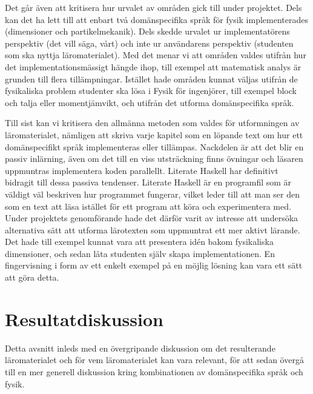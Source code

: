 Det går även att kritisera hur urvalet av områden gick till under projektet. Dels kan det ha lett till att enbart två domänspecifika språk för fysik implementerades (dimensioner och partikelmekanik). Dels skedde urvalet ur implementatörens perspektiv (det vill säga, vårt) och inte ur användarens perspektiv (studenten som ska nyttja läromaterialet). Med det menar vi att områden valdes utifrån hur det implementationsmässigt hängde ihop, till exempel att matematisk analys är grunden till flera tillämpningar. Istället hade områden kunnat väljas utifrån de fysikaliska problem studenter ska lösa i Fysik för ingenjörer, till exempel block och talja eller momentjämvikt, och utifrån det utforma domänspecifika språk.


Till sist kan vi kritisera den allmänna metoden som valdes för utformningen av läromaterialet, nämligen att skriva varje kapitel som en löpande text om hur ett domänspecifikt språk implementeras eller tillämpas. Nackdelen är att det blir en passiv inlärning, även om det till en viss utsträckning finns övningar och läsaren uppmuntras implementera koden parallellt. Literate Haskell har definitivt bidragit till dessa passiva tendenser. Literate Haskell är en programfil som är väldigt väl beskriven hur programmet fungerar, vilket leder till att man ser den som en text att läsa istället för ett program att köra och experimentera med. Under projektets genomförande hade det därför varit av intresse att undersöka alternativa sätt att utforma lärotexten som uppmuntrat ett mer aktivt lärande. Det hade till exempel kunnat vara att presentera idén bakom fysikaliska dimensioner, och sedan låta studenten själv skapa implementationen. En fingervisning i form av ett enkelt exempel på en möjlig lösning kan vara ett sätt att göra detta.

\section{Resultatdiskussion}\label{sec:res_disk}

Detta avsnitt inleds med en övergripande diskussion om det resulterande
läromaterialet och för vem läromaterialet kan vara relevant, för att sedan
övergå till en mer generell diskussion kring kombinationen av domänspecifika
språk och fysik.

